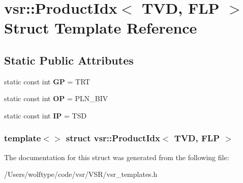 \hypertarget{structvsr_1_1_product_idx_3_01_t_v_d_00_01_f_l_p_01_4}{\section{vsr\-:\-:Product\-Idx$<$ T\-V\-D, F\-L\-P $>$ Struct Template Reference}
\label{structvsr_1_1_product_idx_3_01_t_v_d_00_01_f_l_p_01_4}
}
\subsection*{Static Public Attributes}
\begin{DoxyCompactItemize}
\item 
\hypertarget{structvsr_1_1_product_idx_3_01_t_v_d_00_01_f_l_p_01_4_a5f247082700615a658ece4200ed89deb}{static const int {\bfseries G\-P} = T\-R\-T}\label{structvsr_1_1_product_idx_3_01_t_v_d_00_01_f_l_p_01_4_a5f247082700615a658ece4200ed89deb}

\item 
\hypertarget{structvsr_1_1_product_idx_3_01_t_v_d_00_01_f_l_p_01_4_af07c6a96515cb889e5ab2af71b860215}{static const int {\bfseries O\-P} = P\-L\-N\-\_\-\-B\-I\-V}\label{structvsr_1_1_product_idx_3_01_t_v_d_00_01_f_l_p_01_4_af07c6a96515cb889e5ab2af71b860215}

\item 
\hypertarget{structvsr_1_1_product_idx_3_01_t_v_d_00_01_f_l_p_01_4_a78f11294b4e8360e21af7353c7de4475}{static const int {\bfseries I\-P} = T\-S\-D}\label{structvsr_1_1_product_idx_3_01_t_v_d_00_01_f_l_p_01_4_a78f11294b4e8360e21af7353c7de4475}

\end{DoxyCompactItemize}
\subsubsection*{template$<$$>$ struct vsr\-::\-Product\-Idx$<$ T\-V\-D, F\-L\-P $>$}



The documentation for this struct was generated from the following file\-:\begin{DoxyCompactItemize}
\item 
/\-Users/wolftype/code/vsr/\-V\-S\-R/vsr\-\_\-templates.\-h\end{DoxyCompactItemize}
